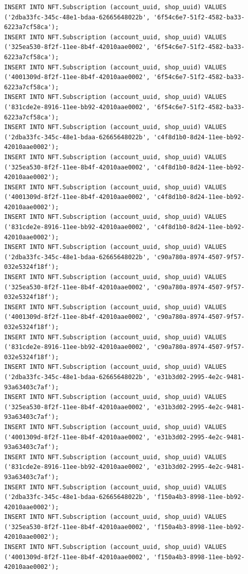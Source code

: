 \documentclass[a4paper, 12pt]{article}
\begin{document}
\begin{lstlisting}
INSERT INTO NFT.Subscription (account_uuid, shop_uuid) VALUES ('2dba33fc-345c-48e1-bdaa-62665648022b', '6f54c6e7-51f2-4582-ba33-6223a7cf58ca');
INSERT INTO NFT.Subscription (account_uuid, shop_uuid) VALUES ('325ea530-8f2f-11ee-8b4f-42010aae0002', '6f54c6e7-51f2-4582-ba33-6223a7cf58ca');
INSERT INTO NFT.Subscription (account_uuid, shop_uuid) VALUES ('4001309d-8f2f-11ee-8b4f-42010aae0002', '6f54c6e7-51f2-4582-ba33-6223a7cf58ca');
INSERT INTO NFT.Subscription (account_uuid, shop_uuid) VALUES ('831cde2e-8916-11ee-bb92-42010aae0002', '6f54c6e7-51f2-4582-ba33-6223a7cf58ca');
INSERT INTO NFT.Subscription (account_uuid, shop_uuid) VALUES ('2dba33fc-345c-48e1-bdaa-62665648022b', 'c4f8d1b0-8d24-11ee-bb92-42010aae0002');
INSERT INTO NFT.Subscription (account_uuid, shop_uuid) VALUES ('325ea530-8f2f-11ee-8b4f-42010aae0002', 'c4f8d1b0-8d24-11ee-bb92-42010aae0002');
INSERT INTO NFT.Subscription (account_uuid, shop_uuid) VALUES ('4001309d-8f2f-11ee-8b4f-42010aae0002', 'c4f8d1b0-8d24-11ee-bb92-42010aae0002');
INSERT INTO NFT.Subscription (account_uuid, shop_uuid) VALUES ('831cde2e-8916-11ee-bb92-42010aae0002', 'c4f8d1b0-8d24-11ee-bb92-42010aae0002');
INSERT INTO NFT.Subscription (account_uuid, shop_uuid) VALUES ('2dba33fc-345c-48e1-bdaa-62665648022b', 'c90a780a-8974-4507-9f57-032e5324f18f');
INSERT INTO NFT.Subscription (account_uuid, shop_uuid) VALUES ('325ea530-8f2f-11ee-8b4f-42010aae0002', 'c90a780a-8974-4507-9f57-032e5324f18f');
INSERT INTO NFT.Subscription (account_uuid, shop_uuid) VALUES ('4001309d-8f2f-11ee-8b4f-42010aae0002', 'c90a780a-8974-4507-9f57-032e5324f18f');
INSERT INTO NFT.Subscription (account_uuid, shop_uuid) VALUES ('831cde2e-8916-11ee-bb92-42010aae0002', 'c90a780a-8974-4507-9f57-032e5324f18f');
INSERT INTO NFT.Subscription (account_uuid, shop_uuid) VALUES ('2dba33fc-345c-48e1-bdaa-62665648022b', 'e31b3d02-2995-4e2c-9481-93a63403c7af');
INSERT INTO NFT.Subscription (account_uuid, shop_uuid) VALUES ('325ea530-8f2f-11ee-8b4f-42010aae0002', 'e31b3d02-2995-4e2c-9481-93a63403c7af');
INSERT INTO NFT.Subscription (account_uuid, shop_uuid) VALUES ('4001309d-8f2f-11ee-8b4f-42010aae0002', 'e31b3d02-2995-4e2c-9481-93a63403c7af');
INSERT INTO NFT.Subscription (account_uuid, shop_uuid) VALUES ('831cde2e-8916-11ee-bb92-42010aae0002', 'e31b3d02-2995-4e2c-9481-93a63403c7af');
INSERT INTO NFT.Subscription (account_uuid, shop_uuid) VALUES ('2dba33fc-345c-48e1-bdaa-62665648022b', 'f150a4b3-8998-11ee-bb92-42010aae0002');
INSERT INTO NFT.Subscription (account_uuid, shop_uuid) VALUES ('325ea530-8f2f-11ee-8b4f-42010aae0002', 'f150a4b3-8998-11ee-bb92-42010aae0002');
INSERT INTO NFT.Subscription (account_uuid, shop_uuid) VALUES ('4001309d-8f2f-11ee-8b4f-42010aae0002', 'f150a4b3-8998-11ee-bb92-42010aae0002');

\end{lstlisting}
\end{document}
